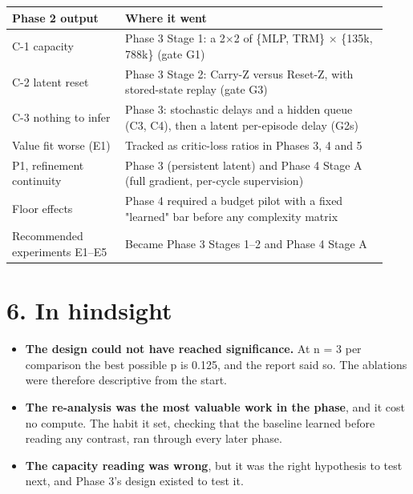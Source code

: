 \documentclass[11pt]{article}
\begin{document}
\begin{center}\small\begin{tabular}{>{\raggedright\arraybackslash}p{0.282\linewidth}>{\raggedright\arraybackslash}p{0.652\linewidth}}
\toprule
Phase 2 output & Where it went \\
\midrule
C-1 capacity & Phase 3 Stage 1: a 2$\times$2 of \{MLP, TRM\} $\times$ \{135k, 788k\} (gate G1) \\
C-2 latent reset & Phase 3 Stage 2: Carry-Z versus Reset-Z, with stored-state replay (gate G3) \\
C-3 nothing to infer & Phase 3: stochastic delays and a hidden queue (C3, C4), then a latent per-episode delay (G2s) \\
Value fit worse (E1) & Tracked as critic-loss ratios in Phases 3, 4 and 5 \\
P1, refinement continuity & Phase 3 (persistent latent) and Phase 4 Stage A (full gradient, per-cycle supervision) \\
Floor effects & Phase 4 required a budget pilot with a fixed "learned" bar before any complexity matrix \\
Recommended experiments E1--E5 & Became Phase 3 Stages 1--2 and Phase 4 Stage A \\
\bottomrule
\end{tabular}\end{center}



\section*{6. In hindsight}



\begin{itemize}
\item \textbf{The design could not have reached significance.} At n = 3 per comparison the best possible p is 0.125, and the report said so. The ablations were therefore descriptive from the start.
\item \textbf{The re-analysis was the most valuable work in the phase}, and it cost no compute. The habit it set, checking that the baseline learned before reading any contrast, ran through every later phase.
\item \textbf{The capacity reading was wrong}, but it was the right hypothesis to test next, and Phase 3's design existed to test it.
\end{itemize}
\end{document}
